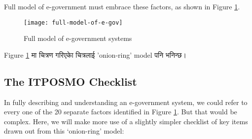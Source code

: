 Full model of e-government must embrace these factors, as shown in Figure \ref{fig:full-model-of-e-gov}.
 
 \begin{figure}[ht]
 	\centering
 	\texttt{[image: full-model-of-e-gov]}
 	\caption{Full model of e-government systems}
 	\label{fig:full-model-of-e-gov}
 \end{figure}


\begin{framed}
		\begin{nepali}
			\begin{center}
			\noindent Figure \ref{fig:full-model-of-e-gov} मा चित्रण गरिएकाे चित्रलाई 'onion-ring' model पनि भनिन्छ।
		\end{center}	
	\end{nepali}
\end{framed}

\subsection*{The ITPOSMO Checklist}
In fully describing and understanding an
e-government system, we could refer to every
one of the 20 separate factors identified in
Figure \ref{fig:full-model-of-e-gov}. But
that would be complex. Here, we will make more use of a slightly
simpler checklist of key items drawn out
from this `onion-ring' model:

